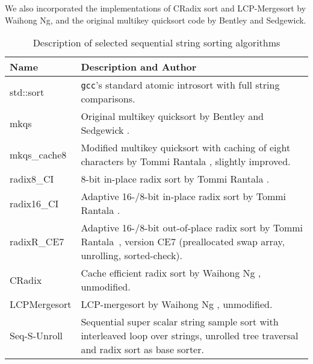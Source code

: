 \documentclass[a4paper]{myjournal}
\begin{document}
We also incorporated the implementations of CRadix sort and LCP-Merge\-sort by
Waihong Ng, and the original multikey quicksort code by Bentley and Sedgewick.

\begin{table}[tb]\centering\normalsize
\caption{Description of selected sequential string sorting algorithms}\label{tab:seqalgo}
\begin{tabularx}{\linewidth}{l|X}
Name             & Description and Author                                                                                                                                        \\ \hline
std::sort        & \texttt{gcc}'s standard atomic introsort with full string comparisons.                                                                                        \\
mkqs             & Original multikey quicksort by Bentley and Sedgewick \cite{bentley1997fast}.                                                                                  \\
mkqs\_cache8     & Modified multikey quicksort with caching of eight characters by Tommi Rantala \cite{rantala2007web}, slightly improved.                                       \\
radix8\_CI       & 8-bit in-place radix sort by Tommi Rantala \cite{karkkainen2009engineering}.                                                                                  \\
radix16\_CI      & Adaptive 16-/8-bit in-place radix sort by Tommi Rantala \cite{karkkainen2009engineering}.                                                                     \\
radixR\_CE7      & Adaptive 16-/8-bit out-of-place radix sort by Tommi Rantala~\cite{karkkainen2009engineering}, version CE7 (preallocated swap array, unrolling, sorted-check). \\
CRadix           & Cache efficient radix sort by Waihong Ng \cite{ng2007cache}, unmodified.                                                                                      \\
LCPMergesort     & LCP-mergesort by Waihong Ng \cite{ng2008merging}, unmodified.                                                                                                 \\
Seq-S-Unroll & Sequential super scalar string sample sort with interleaved loop over strings, unrolled tree traversal and radix sort as base sorter.                         \\

\end{tabularx}
\end{table}
\end{document}
